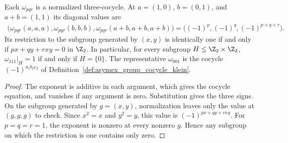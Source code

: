 \begin{lemma}
    \label{thm:asymex_klein_cocycle_restrictions}
    \leanok
    Each $\omega_{pqr}$ is a normalized three-cocycle. At
    $a=(1,0)$, $b=(0,1)$, and $a+b=(1,1)$ its diagonal values are
    \begin{align}
        \bigl(\omega_{pqr}(a,a,a),\omega_{pqr}(b,b,b),
        \omega_{pqr}(a+b,a+b,a+b)\bigr)
        =\bigl((-1)^p,(-1)^q,(-1)^{p+q+r}\bigr).
    \end{align}
    Its restriction to the subgroup generated by $(x,y)$ is identically one
    if and only if $px+qy+rxy=0$ in $\Z_2$. In particular, for every subgroup
    $H\leq\Z_2\times\Z_2$, $\omega_{111}|_H=1$ if and only if $H=\{0\}$.
    The representative $\omega_{001}$ is the cocycle
    $(-1)^{a_1b_2c_2}$ of Definition~\ref{def:asymex_group_cocycle_klein}.
\end{lemma}
\begin{proof}
    \leanok
    The exponent is additive in each argument, which gives the cocycle equation,
    and vanishes if any argument is zero. Substitution gives the three signs.
    On the subgroup generated by $g=(x,y)$, normalization leaves only the value
    at $(g,g,g)$ to check. Since $x^2=x$ and $y^2=y$, this value is
    $(-1)^{px+qy+rxy}$. For $p=q=r=1$, the exponent is nonzero at every
    nonzero $g$. Hence any subgroup on which the restriction is one contains
    only zero.
\end{proof}

